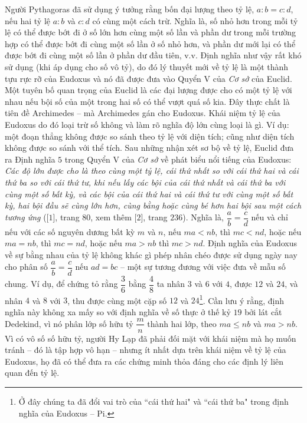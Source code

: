 \begin{multicols}{2}
	\vskip 0.1cm
	Người Pythagoras đã sử dụng ý tưởng rằng bốn đại lượng theo tỷ lệ, $a:b = c : d$,  nếu hai tỷ lệ $a:b$  và $c:d$ có cùng một cách trừ. Nghĩa là, số nhỏ hơn trong mỗi tỷ lệ có thể được bớt đi ở số lớn hơn cùng một số lần và phần dư trong mỗi trường hợp có thể được bớt đi cùng một số lần ở số nhỏ hơn, và phần dư mới lại có thể được bớt đi cùng một số lần ở phần dư đầu tiên, v.v. 
	\vskip 0.1cm
	Định nghĩa như vậy rất khó sử dụng (khi áp dụng cho số vô tỷ), do đó lý thuyết mới về tỷ lệ là một thành tựu rực rỡ của Eudoxus và nó đã được đưa vào Quyển V của \textit{Cơ sở} của Euclid.
	\vskip 0.1cm
	Một tuyên bố quan trọng của Euclid là các đại lượng được cho có một tỷ lệ với nhau nếu bội số của một trong hai số có thể vượt quá số kia. 
	\vskip 0.1cm
	Đây thực chất là tiên đề Archimedes -- mà Archimedes gán cho Eudoxus. Khái niệm tỷ lệ của Eudoxus do đó loại trừ số không và làm rõ nghĩa độ lớn cùng loại là gì. Ví dụ: một đoạn thẳng không được so sánh theo tỷ lệ với diện tích; cũng như diện tích không được so sánh với thể tích.
	\vskip 0.1cm
	Sau những nhận xét sơ bộ về tỷ lệ, Euclid đưa ra Định nghĩa $5$ trong Quyển V của \textit{Cơ sở} về phát biểu nổi tiếng của Eudoxus: \textit{Các độ lớn được cho là theo cùng một tỷ lệ, cái thứ nhất so với cái thứ hai và cái thứ ba so với cái thứ tư, khi nếu lấy các bội của cái thứ nhất và cái thứ ba với cùng một số bất kỳ, và các bội của cái thứ hai và cái thứ tư với cùng một số bất kỳ, hai bội đầu sẽ cùng lớn hơn, cùng bằng hoặc cùng bé hơn hai bội sau một cách tương ứng} ([$1$], trang $80$, xem thêm [$2$], trang $236$).
	\vskip 0.1cm
	Nghĩa là, $\dfrac{a}{b} = \dfrac{c}{d}$  nếu và chỉ nếu với các số nguyên dương bất kỳ $m$  và $n$,  nếu $ma < nb$,  thì $mc < nd$,  hoặc nếu $ma = nb$,  thì $mc = nd$,  hoặc nếu $ma > nb$  thì $mc > nd$. 
	\vskip 0.1cm
	Định nghĩa của Eudoxus về sự bằng nhau của tỷ lệ không khác gì phép nhân chéo được sử dụng ngày nay cho phân số $\dfrac{a}{b} = \dfrac{c}{d}$ nếu $ad = bc$ -- một sự tương đương với việc đưa về mẫu số chung.  Ví dụ, để chứng tỏ rằng $\dfrac{3}{6}$  bằng $\dfrac{4}{8}$  ta nhân $3$ và $6$ với $4$, được $12$ và $24$, và nhân $4$ và $8$ với $3$, thu được cùng một cặp số $12$ và $24$\footnote[2]{\color{lichsutoanhoc}Ở đây chúng ta đã đổi vai trò của ``cái thứ hai" và ``cái thứ ba" trong định nghĩa của Eudoxus -- Pi.}.
	\vskip 0.1cm 
	Cần lưu ý rằng, định nghĩa này không xa mấy so với định nghĩa về số thực ở thế kỷ $19$ bởi lát cắt Dedekind, vì nó phân lớp số hữu tỷ  $\dfrac{m}{n}$  thành hai lớp, theo $ma \le nb$  và $ma > nb$.
	\vskip 0.1cm 
	Vì có vô số số hữu tỷ, người Hy Lạp đã phải đối mặt với khái niệm mà họ muốn tránh -- đó là tập hợp vô hạn -- nhưng ít nhất dựa trên khái niệm về tỷ lệ của Eudoxus, họ đã có thể đưa ra các chứng minh thỏa đáng cho các định lý liên quan đến tỷ lệ.

\end{multicols}

